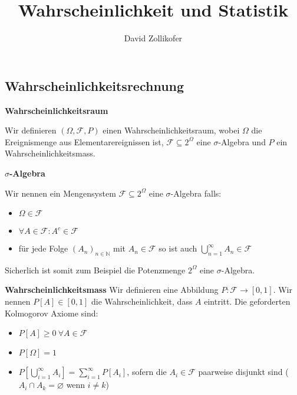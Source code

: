 \documentclass[25pt]{sciposter}
\title{\huge{Wahrscheinlichkeit und Statistik}}
\author{\large{David Zollikofer}}
\newcommand{\N}{\mathbb{N}}
\newcommand{\F}{\mathcal{F}}
\newenvironment{method}[1]{\begin{mdframed}[backgroundcolor=blue!10,innertopmargin=15pt, innerbottommargin=15pt,nobreak=true]
		\textbf{#1 }
	}
	{ 
	\end{mdframed}
}
\begin{document}
\maketitle



\begin{multicols}{3}



\section{Wahrscheinlichkeitsrechnung}

\begin{method}{Wahrscheinlichkeitsraum}
	Wir definieren $(\Omega, \mathcal{F}, P)$ einen Wahrscheinlichkeitsraum, wobei $\Omega$ die Ereignismenge aus Elementarereignissen ist, $\F \subseteq 2^\Omega$ eine $\sigma$-Algebra und $P$ ein Wahrscheinlichkeitsmass.
\end{method}

\begin{method}{$\sigma$-Algebra}
	Wir nennen ein Mengensystem $\F\subseteq 2^\Omega$ eine $\sigma$-Algebra falls:
	\begin{itemize}
		\item $\Omega \in \F$
		\item $\forall A \in \F : A^c \in \F$
		\item für jede Folge $(A_n)_{n\in\N}$ mit $A_n \in \F$ so ist auch $\bigcup_{n=1}^\infty A_n \in \F $
	\end{itemize}

Sicherlich ist somit zum Beispiel die Potenzmenge $2^\Omega$ eine $\sigma$-Algebra.
\end{method}

\begin{method}{Wahrscheinlichkeitsmass} Wir definieren eine Abbildung $P: \F \to [0,1]$. Wir nennen $P[A]\in[0,1]$ die Wahrscheinlichkeit, dass $A$ eintritt. Die geforderten Kolmogorov Axiome sind:
	\begin{itemize}
		\item $P[A]\geq 0 \ \forall A \in \F$
		\item $P[\Omega] = 1$
		\item $P\left[ \bigcup_{i=1}^{\infty} A_i \right] = \sum_{i=1}^{\infty}P[A_i]$, sofern die $A_i \in \F$ paarweise disjunkt sind ($A_i \cap A_k = \varnothing$ wenn $i \neq k$) 
	\end{itemize}
\end{method}


\end{multicols}
\end{document}
